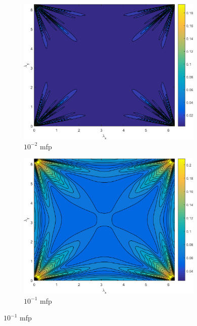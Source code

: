 \begin{figure}
\centering
	{
	\begin{subfigure}[b]{0.485\textwidth}
		\centering
		\includegraphics[width=0.975\textwidth]{figures/appendices/SI_M4S_UPWLD1_LS8_x=1e-2_dydx=1_contour.png}
		\caption{$10^{-2}$ mfp}
	\end{subfigure}
	\hfill
	\begin{subfigure}[b]{0.485\textwidth}
		\centering
		\includegraphics[width=0.975\textwidth]{figures/appendices/SI_M4S_UPWLD1_LS8_x=1e-1_dydx=1_contour.png}
		\caption{$10^{-1}$ mfp}
	\end{subfigure}
	}
	\vspace{0.5cm}

\end{figure}
